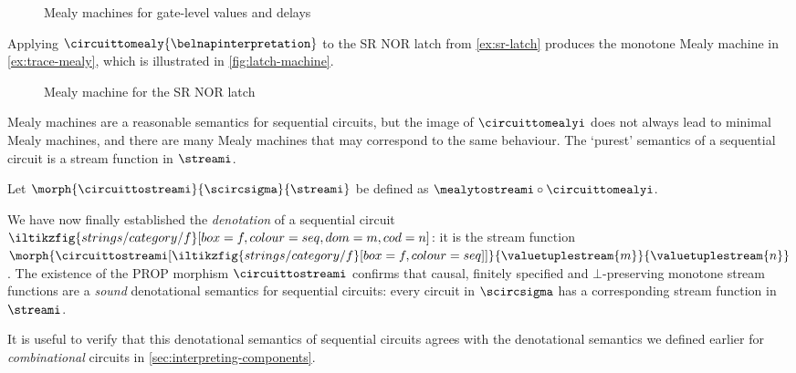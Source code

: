 \documentclass{lmcs}
\begin{document}
\begin{figure}
    \centering
    

    \vspace{1em}

    
    \caption{
        Mealy machines for gate-level values and delays
    }
    \label{fig:belnap-machines}
\end{figure}

\begin{exa}\label{ex:mealy-translation}
    Applying \(\circuittomealy{\belnapinterpretation}\) to the SR NOR latch from
    \autoref{ex:sr-latch} produces the monotone Mealy machine in
    \autoref{ex:trace-mealy}, which is illustrated in \autoref{fig:latch-machine}.
\end{exa}

\begin{figure}
    \centering
    
    \caption{
        Mealy machine for the SR NOR latch
    }
    \label{fig:latch-machine}
\end{figure}

Mealy machines are a reasonable semantics for sequential circuits, but the
image of \(\circuittomealyi\) does not always lead to minimal Mealy machines,
and there are many Mealy machines that may correspond to the same behaviour.
The `purest' semantics of a sequential circuit is a stream function in
\(\streami\).

\begin{defi}
    Let \(\morph{\circuittostreami}{\scircsigma}{\streami}\) be defined as
    \(\mealytostreami \circ \circuittomealyi\).
\end{defi}

We have now finally established the \emph{denotation} of a sequential circuit \(
\iltikzfig{strings/category/f}[box=f,colour=seq,dom=m,cod=n]
\): it is the stream function \(
\morph{\circuittostreami[\iltikzfig{strings/category/f}[box=f,colour=seq]]}{\valuetuplestream{m}}{\valuetuplestream{n}}
\).
The existence of the PROP morphism \(\circuittostreami\) confirms that causal,
finitely specified and \(\bot\)-preserving monotone stream functions are a
\emph{sound} denotational semantics for sequential circuits: every circuit in
\(\scircsigma\) has a corresponding stream function in \(\streami\).

It is useful to verify that this denotational semantics of sequential circuits
agrees with the denotational semantics we defined earlier for
\emph{combinational} circuits in \autoref{sec:interpreting-components}.
\end{document}

